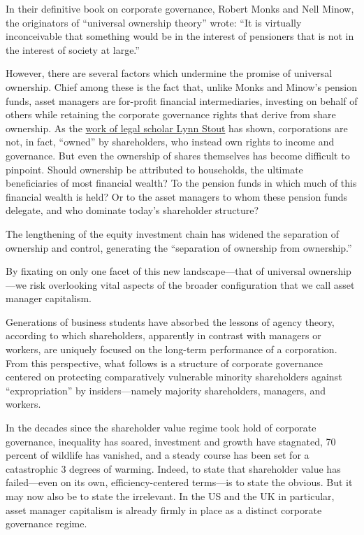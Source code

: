 \documentclass[
]{book}
\begin{document}
In their definitive book on corporate governance, Robert Monks and Nell Minow, the originators of ``universal ownership theory'' wrote: ``It is virtually inconceivable that something would be in the interest of pensioners that is not in the interest of society at large.''

However, there are several factors which undermine the promise of universal ownership. Chief among these is the fact that, unlike Monks and Minow's pension funds, asset managers are for-profit financial intermediaries, investing on behalf of others while retaining the corporate governance rights that derive from share ownership. As the \href{https://www.bkconnection.com/static/The_Shareholder_Value_Myth_EXCERPT.pdf}{work of legal scholar Lynn Stout} has shown, corporations are not, in fact, ``owned'' by shareholders, who instead own rights to income and governance. But even the ownership of shares themselves has become difficult to pinpoint. Should ownership be attributed to households, the ultimate beneficiaries of most financial wealth? To the pension funds in which much of this financial wealth is held? Or to the asset managers to whom these pension funds delegate, and who dominate today's shareholder structure?

The lengthening of the equity investment chain has widened the separation of ownership and control, generating the ``separation of ownership from ownership.''

By fixating on only one facet of this new landscape---that of universal ownership---we risk overlooking vital aspects of the broader configuration that we call asset manager capitalism.

Generations of business students have absorbed the lessons of agency theory, according to which shareholders, apparently in contrast with managers or workers, are uniquely focused on the long-term performance of a corporation. From this perspective, what follows is a structure of corporate governance centered on protecting comparatively vulnerable minority shareholders against ``expropriation'' by insiders---namely majority shareholders, managers, and workers.

In the decades since the shareholder value regime took hold of corporate governance, inequality has soared, investment and growth have stagnated, 70 percent of wildlife has vanished, and a steady course has been set for a catastrophic 3 degrees of warming. Indeed, to state that shareholder value has failed---even on its own, efficiency-centered terms---is to state the obvious. But it may now also be to state the irrelevant. In the US and the UK in particular, asset manager capitalism is already firmly in place as a distinct corporate governance regime.
\end{document}
